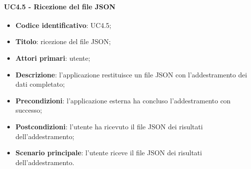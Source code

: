 \paragraph{UC4.5 - Ricezione del file JSON}
\begin{itemize}
    \item \textbf{Codice identificativo}: UC4.5;
    \item \textbf{Titolo}: ricezione del file JSON;
    \item \textbf{Attori primari}: utente;
    \item \textbf{Descrizione}: l'applicazione restituisce un file JSON con l'addestramento dei dati completato;
    \item \textbf{Precondizioni}: l'applicazione esterna ha concluso l'addestramento con successo;
    \item \textbf{Postcondizioni}: l'utente ha ricevuto il file JSON dei risultati dell'addestramento;
    \item \textbf{Scenario principale}: l'utente riceve il file JSON dei risultati dell'addestramento.
\end{itemize}